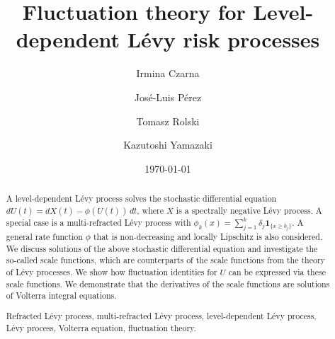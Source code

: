 \documentclass[12pt,reqno]{amsart}
\title{Fluctuation theory for Level-dependent L\'evy risk processes }
\author{Irmina Czarna}
\author{Jos\'e-Luis P\'erez}
\author{Tomasz Rolski
}
\author{Kazutoshi Yamazaki
}
\date{\today}
\theoremstyle{definition}
\theoremstyle{remark}
\newcommand{\ind}{\mathbf{1}}
\begin{document}
\begin{abstract}
A level-dependent L\'evy process solves the stochastic differential equation $dU(t)=dX(t)-\phi(U(t))\,dt$, 
where $X$ is a spectrally negative L\'evy process. A special case is a multi-refracted L\'evy process with 
$\phi_k(x)=\sum_{j=1}^k\delta_j\ind_{\{x\ge b_j\}}$. A general rate function $\phi$ that is non-decreasing and 
locally Lipschitz is also considered. We discuss solutions of the above stochastic differential equation and investigate 
the so-called scale functions, which are counterparts of the scale functions from the theory of L\'evy processes. 
We show how fluctuation identities for $U$ can be expressed via these scale functions. We demonstrate that the derivatives of the scale 
functions are solutions of Volterra integral equations.
 

\vspace{3mm}

 {Refracted} L\'evy process, multi-refracted L\'evy process, level-dependent L\'evy process, L\'evy process, Volterra equation, fluctuation theory.

\end{abstract}

\maketitle


\newpage
\vspace{5cm}


\newpage
\end{document}

